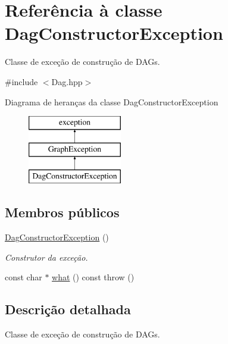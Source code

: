 \hypertarget{classDagConstructorException}{}\section{Referência à classe Dag\+Constructor\+Exception}
\label{classDagConstructorException}


Classe de exceção de construção de D\+A\+Gs.  




{\ttfamily \#include $<$Dag.\+hpp$>$}

Diagrama de heranças da classe Dag\+Constructor\+Exception\begin{figure}[H]
\begin{center}
\leavevmode
\includegraphics[height=3.000000cm]{classDagConstructorException}
\end{center}
\end{figure}
\subsection*{Membros públicos}
\begin{DoxyCompactItemize}
\item 
\mbox{\label{classDagConstructorException_a0c6e8ae8788ed7b42f73f4f1bfb0198f}} 
\mbox{\hyperlink{classDagConstructorException_a0c6e8ae8788ed7b42f73f4f1bfb0198f}{Dag\+Constructor\+Exception}} ()
\begin{DoxyCompactList}\small\item\em Construtor da exceção. \end{DoxyCompactList}\item 
const char $\ast$ \mbox{\hyperlink{classDagConstructorException_a3ad88177747ce6ef7273d1196258c7ba}{what}} () const  throw ()
\end{DoxyCompactItemize}


\subsection{Descrição detalhada}
Classe de exceção de construção de D\+A\+Gs. 


